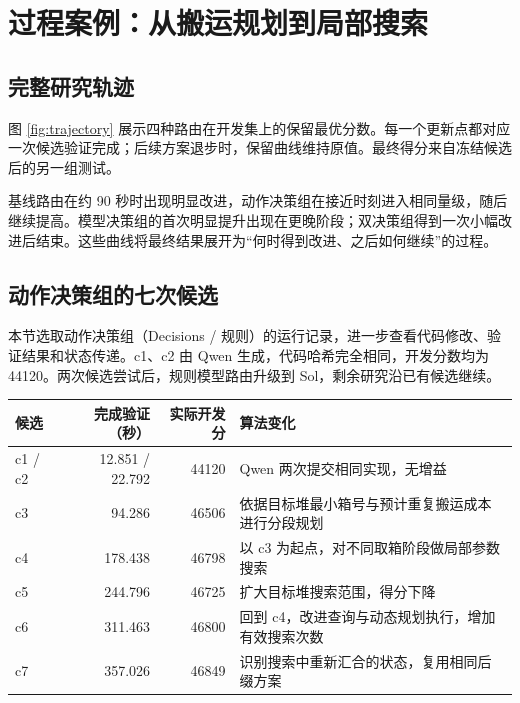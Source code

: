 \section{过程案例：从搬运规划到局部搜索}\label{sec:case}
\subsection{完整研究轨迹}
图 \ref{fig:trajectory} 展示四种路由在开发集上的保留最优分数。每一个更新点都对应一次候选验证完成；后续方案退步时，保留曲线维持原值。最终得分来自冻结候选后的另一组测试。


基线路由在约 90 秒时出现明显改进，动作决策组在接近时刻进入相同量级，随后继续提高。模型决策组的首次明显提升出现在更晚阶段；双决策组得到一次小幅改进后结束。这些曲线将最终结果展开为“何时得到改进、之后如何继续”的过程。

\subsection{动作决策组的七次候选}
本节选取动作决策组（Decisions / 规则）的运行记录，进一步查看代码修改、验证结果和状态传递。c1、c2 由 Qwen 生成，代码哈希完全相同，开发分数均为 44120。两次候选尝试后，规则模型路由升级到 Sol，剩余研究沿已有候选继续。


\begin{smalltable}
\begin{tabularx}{\linewidth}{@{}lrrL@{}}\toprule
候选 & 完成验证（秒） & 实际开发分 & 算法变化\\\midrule
c1 / c2 & 12.851 / 22.792 & 44120 & Qwen 两次提交相同实现，无增益\\
c3 & 94.286 & 46506 & 依据目标堆最小箱号与预计重复搬运成本进行分段规划\\
c4 & 178.438 & 46798 & 以 c3 为起点，对不同取箱阶段做局部参数搜索\\
c5 & 244.796 & 46725 & 扩大目标堆搜索范围，得分下降\\
c6 & 311.463 & 46800 & 回到 c4，改进查询与动态规划执行，增加有效搜索次数\\
c7 & 357.026 & 46849 & 识别搜索中重新汇合的状态，复用相同后缀方案\\\bottomrule
\end{tabularx}
\end{smalltable}

